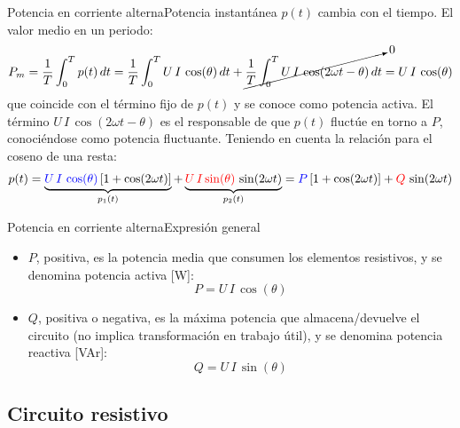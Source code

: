 \documentclass[aspectratio=169, xcolor={usenames,svgnames,dvipsnames}]{beamer}
\begin{document}
\begin{frame}{Potencia en corriente alterna}{Potencia instantánea} 
$p(t)$ cambia con el tiempo. El valor medio en un periodo:
	\begin{equation*}
		P_m=\dfrac{1}{T}\int_{0}^{T}p(t)\,dt=\dfrac{1}{T}\int_{0}^{T}U\,I\,\cos(\theta)\,dt+\cancelto{0}{\dfrac{1}{T}\int_{0}^{T}U\,I\,\cos(2\omega t-\theta)\,dt}=U\,I\,\cos(\theta)
	\end{equation*}
	que coincide con el \alert{término fijo} de $p(t)$ y se conoce como \alert{potencia activa}. El término $U\,I\,\cos(2\omega t-\theta)$ es el responsable de que $p(t)$ fluctúe en torno a $P$, conociéndose como \alert{potencia fluctuante}. Teniendo en cuenta la relación para el coseno de una resta: 
	\begin{equation*}
		p(t)=\underbrace{{\color{blue}U\,I\,\cos(\theta)}\left[1+\cos(2\omega t)\right]}_{p_1(t)} + \underbrace{{\color{red}U\,I\sin(\theta)}\,\sin(2\omega t)}_{p_2(t)}={\color{blue}P}\left[1+\cos(2\omega t)\right] + {\color{red}Q}\,\sin(2\omega t)
	\end{equation*}
	\end{frame}
	
	\begin{frame}{Potencia en corriente alterna}{Expresión general}
	\begin{itemize}
		\item $P$, positiva, es la potencia media que consumen los elementos resistivos, y se denomina \alert{potencia activa} [W]:
		\begin{equation*}
			\boxed{P=U\,I\,\cos(\theta)}
		\end{equation*}
		\item $Q$, positiva o negativa, es la máxima potencia que almacena/devuelve el circuito (no implica transformación en trabajo útil), y se denomina \alert{potencia reactiva} [VAr]:
		\begin{equation*}
			\boxed{Q=U\,I\,\sin(\theta)}
		\end{equation*}
	\end{itemize}
\end{frame}

\subsection{Circuito resistivo}
\end{document}
